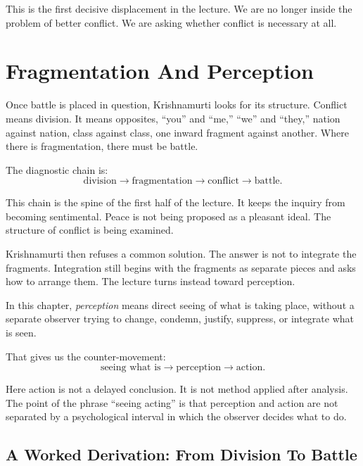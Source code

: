 This is the first decisive displacement in the lecture. We are no longer inside the problem of better conflict. We are asking whether conflict is necessary at all.

\section{Fragmentation And Perception}

Once battle is placed in question, Krishnamurti looks for its structure. Conflict means division. It means opposites, ``you'' and ``me,'' ``we'' and ``they,'' nation against nation, class against class, one inward fragment against another. Where there is fragmentation, there must be battle.

The diagnostic chain is:
\begin{equation}
\text{division}
   \longrightarrow
\text{fragmentation}
   \longrightarrow
\text{conflict}
   \longrightarrow
\text{battle}.
\end{equation}

This chain is the spine of the first half of the lecture. It keeps the inquiry from becoming sentimental. Peace is not being proposed as a pleasant ideal. The structure of conflict is being examined.

Krishnamurti then refuses a common solution. The answer is not to integrate the fragments. Integration still begins with the fragments as separate pieces and asks how to arrange them. The lecture turns instead toward perception.

\begin{definition}
In this chapter, \emph{perception} means direct seeing of what is taking place, without a separate observer trying to change, condemn, justify, suppress, or integrate what is seen.
\end{definition}

That gives us the counter-movement:
\begin{equation}
\text{seeing what is}
   \longrightarrow
\text{perception}
   \longrightarrow
\text{action}.
\end{equation}

Here action is not a delayed conclusion. It is not method applied after analysis. The point of the phrase ``seeing acting'' is that perception and action are not separated by a psychological interval in which the observer decides what to do.

\subsection{A Worked Derivation: From Division To Battle}

